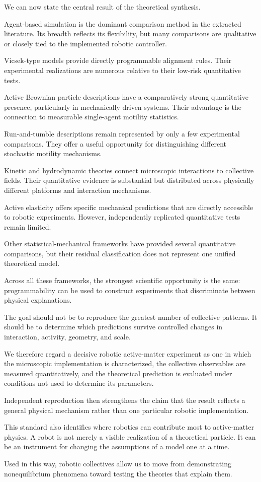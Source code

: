 We can now state
the central result
of the theoretical
synthesis.

Agent-based simulation
is the dominant
comparison method
in the extracted
literature.
Its breadth
reflects its
flexibility,
but many comparisons
are qualitative
or closely tied
to the implemented
robotic controller.

Vicsek-type
models provide
directly programmable
alignment rules.
Their experimental
realizations are
numerous relative
to their low-risk
quantitative tests.

Active Brownian
particle descriptions
have a comparatively
strong quantitative
presence, particularly
in mechanically driven
systems.
Their advantage
is the connection
to measurable
single-agent
motility statistics.

Run-and-tumble
descriptions remain
represented by
only a few
experimental comparisons.
They offer
a useful opportunity
for distinguishing
different stochastic
motility mechanisms.

Kinetic and
hydrodynamic theories
connect microscopic
interactions
to collective
fields.
Their quantitative
evidence is
substantial but
distributed across
physically different
platforms and
interaction mechanisms.

Active elasticity
offers specific
mechanical predictions
that are directly
accessible to
robotic experiments.
However, independently
replicated quantitative
tests remain limited.

Other statistical-mechanical
frameworks have
provided several
quantitative comparisons,
but their residual
classification
does not represent
one unified
theoretical model.

Across all these
frameworks,
the strongest
scientific opportunity
is the same:
programmability
can be used
to construct
experiments
that discriminate
between physical
explanations.

The goal should
not be to reproduce
the greatest
number of
collective patterns.
It should be
to determine
which predictions
survive controlled
changes in
interaction,
activity,
geometry,
and scale.

We therefore
regard a
decisive robotic
active-matter
experiment as
one in which
the microscopic
implementation
is characterized,
the collective
observables
are measured
quantitatively,
and the theoretical
prediction is
evaluated under
conditions not
used to determine
its parameters.

Independent
reproduction
then strengthens
the claim
that the
result reflects
a general
physical mechanism
rather than
one particular
robotic implementation.

This standard
also identifies
where robotics
can contribute
most to
active-matter
physics.
A robot is
not merely
a visible
realization
of a
theoretical
particle.
It can be
an instrument
for changing
the assumptions
of a model
one at
a time.

Used in
this way,
robotic
collectives
allow us
to move
from demonstrating
nonequilibrium
phenomena
toward testing
the theories
that explain
them.

